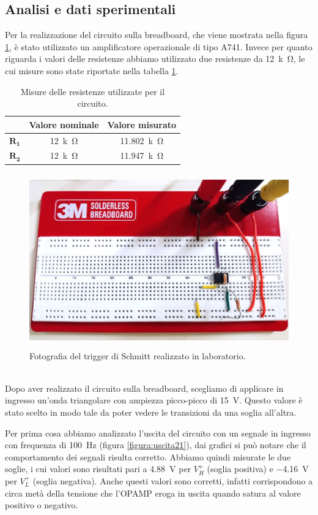 \documentclass{report}
\begin{document}
\subsection{Analisi e dati sperimentali}
Per la realizzazione del circuito sulla breadboard, che viene mostrata nella figura \ref{figura:circuito2}, è stato utilizzato un amplificatore operazionale di tipo \textmu A741. Invece per quanto riguarda i valori delle resistenze abbiamo utilizzato due resistenze da \SI{12}{k\ohm}, le cui misure sono state riportate nella tabella \ref{table:mis_res2}.
\begin{table}[h!]
	\centering
	\begin{tabular}{|c|c|c|}
		\cline{2-3} 
		\multicolumn{1}{c|}{} & \textbf{Valore nominale} & \textbf{Valore misurato}\\ 
		\hline
		$\mathbf{R_1}$ & \SI{12}{k\ohm} & \SI{11.802}{k\ohm} \\ 
		\hline
		$\mathbf{R_2}$ & \SI{12}{k\ohm} & \SI{11.947}{k\ohm} \\ 
		\hline
	\end{tabular}
	\caption{Misure delle resistenze utilizzate per il circuito.}
	\label{table:mis_res2}
\end{table}
\begin{figure}[h]
	\centering
	\includegraphics[height=7.5cm]{immagini/circuito2}
	\caption{Fotografia del trigger di Schmitt realizzato in laboratorio.}
	\label{figura:circuito2}
\end{figure}
\\Dopo aver realizzato il circuito sulla breadboard, scegliamo di applicare in ingresso un'onda triangolare con ampiezza picco-picco di \SI{15}{\volt}. Questo valore è stato scelto in modo tale da poter vedere le transizioni da una soglia all'altra.\par
Per prima cosa abbiamo analizzato l'uscita del circuito con un segnale in ingresso con frequenza di \SI{100}{\hertz} (figura \ref{figura:uscita21}), dai grafici si può notare che il comportamento dei segnali risulta corretto. Abbiamo quindi misurate le due soglie, i cui valori sono risultati pari a \SI{4.88}{\volt} per ${V_H^+}$ (soglia positiva) e \SI{-4.16}{\volt} per ${V_L^+}$ (soglia negativa). Anche questi valori sono corretti, infatti corrispondono a circa metà della tensione che l'OPAMP eroga in uscita quando satura al valore positivo o negativo.
\end{document}

